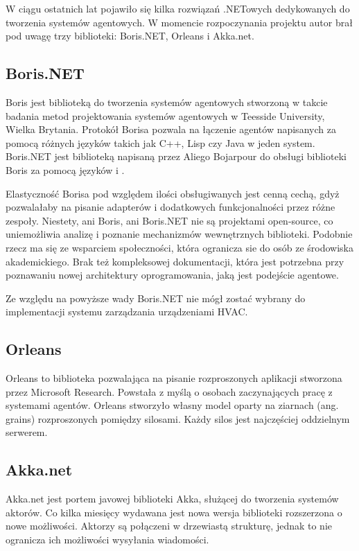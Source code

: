 W ciągu ostatnich lat pojawiło się kilka rozwiązań .NETowych dedykowanych do tworzenia systemów agentowych. W momencie rozpoczynania projektu autor brał pod uwagę trzy biblioteki: Boris.NET, Orleans i Akka.net.

\subsection{Boris.NET}
Boris jest biblioteką do tworzenia systemów agentowych stworzoną w takcie badania metod projektowania systemów agentowych w Teesside University, Wielka Brytania. Protokół Borisa pozwala na łączenie agentów napisanych za pomocą różnych języków takich jak C++, Lisp czy Java w jeden system\cite{bib:Boris}. Boris.NET jest biblioteką napisaną przez Aliego Bojarpour do obsługi biblioteki Boris za pomocą języków \csh i \fsh \cite{bib:BorisNET}. 

Elastyczność Borisa pod względem ilości obsługiwanych jest cenną cechą, gdyż pozwalałaby na pisanie adapterów i dodatkowych funkcjonalności przez różne zespoły. 
Niestety, ani Boris, ani Boris.NET nie są projektami open-source, co uniemożliwia analizę i poznanie mechanizmów wewnętrznych biblioteki. Podobnie rzecz ma się ze wsparciem społeczności, która ogranicza sie do osób ze środowiska akademickiego. Brak też kompleksowej dokumentacji, która jest potrzebna przy poznawaniu nowej architektury oprogramowania, jaką jest podejście agentowe.

Ze względu na powyższe wady Boris.NET nie mógł zostać wybrany do implementacji systemu zarządzania urządzeniami HVAC.

\subsection{Orleans}
Orleans to biblioteka pozwalająca na pisanie rozproszonych aplikacji stworzona przez Microsoft Research.
Powstała z myślą o osobach zaczynających pracę z systemami agentów. 
Orleans stworzyło własny model oparty na ziarnach (ang. grains) rozproszonych pomiędzy silosami. Każdy silos jest najczęściej oddzielnym serwerem.
  
\subsection{Akka.net}
Akka.net jest portem javowej biblioteki Akka, służącej do tworzenia systemów aktorów. 
Co kilka miesięcy wydawana jest nowa wersja biblioteki rozszerzona o nowe możliwości. 
Aktorzy są połączeni w drzewiastą strukturę, jednak to nie ogranicza ich możliwości wysyłania wiadomości. 

